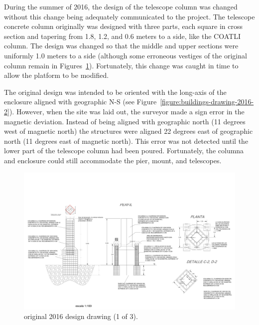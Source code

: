 During the summer of 2016, the design of the telescope column was changed without this change being adequately communicated to the project. The telescope concrete column  originally was designed with three parts, each square in cross section and tapering from 1.8, 1.2, and 0.6 meters to a side, like the COATLI column. The design was changed so that the middle and upper sections were uniformly 1.0 meters to a side (although some erroneous vestiges of the original column remain in Figures~\ref{figure:buildings-drawing-2016-1}). Fortunately, this change was caught in time to allow the platform to be modified.

The original design was intended to be oriented with the long-axis of the enclosure aligned with geographic N-S (see Figure~\ref{figure:buildings-drawing-2016-2}). However, when the site was laid out, the surveyor made a sign error in the magnetic deviation. Instead of being aligned with geographic north (11 degrees west of magnetic north) the structures were aligned 22 degrees east of geographic north (11 degrees east of magnetic north). This error was not detected until the lower part of the telescope column had been poured. Fortunately, the columna and enclosure could still accommodate the pier, mount, and telescopes.

\begin{figure}
\begin{center}
\includegraphics[height=0.95\linewidth,angle=90]{figures/buildings-ddoti-drawing-2016-1.pdf}
\end{center}
\caption{{\projectname} original 2016 design drawing (1 of 3).}
\label{figure:buildings-drawing-2016-1}
\end{figure}

